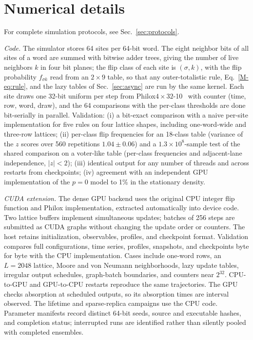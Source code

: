 \section{Numerical details}
\label{app:numerics}

For complete simulation protocols, see Sec.~\ref{sec:protocols}.

\textit{Code.} The simulator stores 64 sites per 64-bit word. The eight neighbor bits of all sites
of a word are summed with bitwise adder trees, giving the number of live neighbors $k$ in four
bit planes; the flip class of each site is $(\sigma, k)$, with the flip probability $f_{\sigma k}$
read from an $2\times 9$ table, so that any outer-totalistic rule, Eq.~\eqref{M-eq:rule}, and the lazy
tables of Sec.~\ref{sec:async} are run by the same kernel. Each site draws one 32-bit uniform per
step from Philox$4\times32$-10~\cite{salmon2011} with counter (time, row, word, draw), and the 64
comparisons with the per-class thresholds are done bit-serially in parallel. Validation: (i) a
bit-exact comparison with a naive per-site implementation for five rules on four lattice shapes,
including one-word-wide and three-row lattices; (ii) per-class flip frequencies for an 18-class
table (variance of the $z$ scores over 560 repetitions $1.04\pm0.06$) and a $1.3\times10^8$-sample
test of the shared comparison on a voter-like table (per-class frequencies and adjacent-lane
independence, $|z|<2$); (iii) identical output for any number of threads and across restarts
from checkpoints; (iv) agreement with an independent GPU implementation of the $p = 0$ model to
1\% in the stationary density.

\textit{CUDA extension.} The dense GPU backend uses the original CPU integer
flip function and Philox implementation, extracted automatically into device
code. Two lattice buffers implement simultaneous updates; batches of 256 steps
are submitted as CUDA graphs without changing the update order or counters.
The host retains initialization, observables, profiles, and checkpoint format.
Validation compares full configurations, time series, profiles, snapshots, and
checkpoints byte for byte with the CPU implementation. Cases include one-word
rows, an $L=2048$ lattice, Moore and von Neumann neighborhoods, lazy update
tables, irregular output schedules, graph-batch boundaries, and counters near
$2^{32}$. CPU-to-GPU and GPU-to-CPU restarts reproduce the same trajectories.
The GPU checks absorption at scheduled outputs, so its absorption times are
interval observed. The lifetime and sparse-replica campaigns use the CPU code.
Parameter manifests record distinct 64-bit seeds, source and executable hashes,
and completion status; interrupted runs are identified rather than silently
pooled with completed ensembles.

